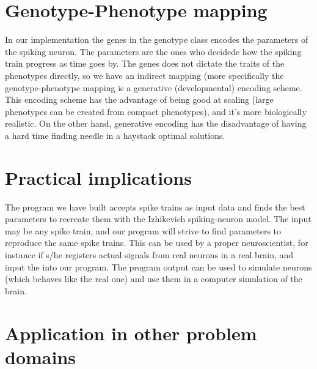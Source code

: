 \documentclass[12pt]{article}
\begin{document}
\section{Genotype-Phenotype mapping}\label{sec:mapping}
In our implementation the genes in the genotype class encodes the parameters of the spiking neuron. The parameters are the ones who decidede how the spiking train progress as time goes by. The genes does not dictate the traits of the phenotypes directly, so we have an indirect mapping (more specifically the genotype-phenotype mapping is a generative (developmental) encoding scheme. This encoding scheme has the advantage of being good at scaling (large phenotypes can be created from compact phenotypes), and it's more biologically realistic. On the other hand, generative encoding has the disadvantage of having a hard time finding needle in a haystack optimal solutions.
\section{Practical implications}\label{sec:implications}
The program we have built accepts spike trains as input data and finds the best parameters to recreate them with the Izhikevich spiking-neuron model. The input may be any spike train, and our program will strive to find parameters to reproduce the same spike trains. This can be used by a proper neuroscientist, for instance if s/he registers actual signals from real neurons in a real brain, and input the into our program. The program output can be used to simulate neurons (which behaves like the real one) and use them in a computer simulation of the brain.
\section{Application in other problem domains}\label{sec:applications}
\end{document}
